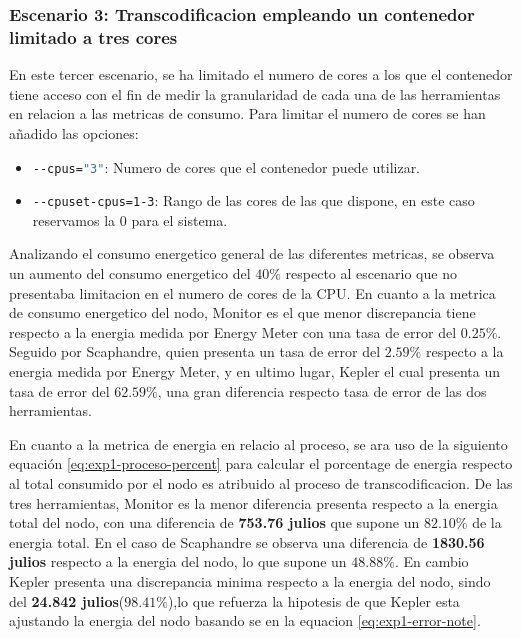 \subsubsection{Escenario 3: Transcodificacion empleando un contenedor limitado a tres cores}
 En este tercer escenario, se ha limitado el numero de cores a los que el contenedor tiene acceso con el fin de medir la granularidad de cada una de las herramientas en relacion a las metricas de consumo. Para limitar el numero de cores se han añadido las opciones:
\begin{itemize} 
 \item \texttt{\lstinline[language=sh]{--cpus="3"}}: Numero de cores que el contenedor puede utilizar.
 \item \texttt{\lstinline[language=sh]{--cpuset-cpus=1-3}}: Rango de las cores de las que dispone, en este caso reservamos la 0 para el sistema.
\end{itemize}
 
 
 Analizando el consumo energetico general de las diferentes metricas, se observa un aumento del consumo energetico del \textbf{$40\%$} respecto al escenario que no presentaba limitacion en el numero de cores de la CPU. En cuanto a la metrica de consumo energetico del nodo, Monitor es el que menor discrepancia tiene respecto a la energia medida por Energy Meter con una tasa de error del \textbf{$0.25\%$}. Seguido por Scaphandre, quien presenta un tasa de error del \textbf{$2.59\%$} respecto a la energia medida por Energy Meter, y en ultimo lugar, Kepler el cual presenta un tasa de error del \textbf{$62.59\%$}, una gran diferencia respecto tasa de error de las dos herramientas.
 
 En cuanto a la metrica de energia en relacio al proceso, se ara uso de la siguiento equación \ref{eq:exp1-proceso-percent} para calcular el porcentage de energia respecto al total consumido por el nodo es atribuido al proceso de transcodificacion. De las tres herramientas, Monitor es la menor diferencia presenta respecto a la energia total del nodo, con una diferencia de \textbf{753.76 julios} que supone un  \textbf{$82.10\%$} de la energia total. En el caso de Scaphandre se observa una diferencia de \textbf{1830.56 julios} respecto a la energia del nodo, lo que supone un \textbf{$48.88\%$}. En cambio Kepler presenta una discrepancia minima  respecto a la energia del nodo, sindo del \textbf{24.842 julios}($98.41\%$),lo que refuerza la hipotesis de que Kepler esta ajustando la energia del nodo basando se en la equacion \ref{eq:exp1-error-note}. 

